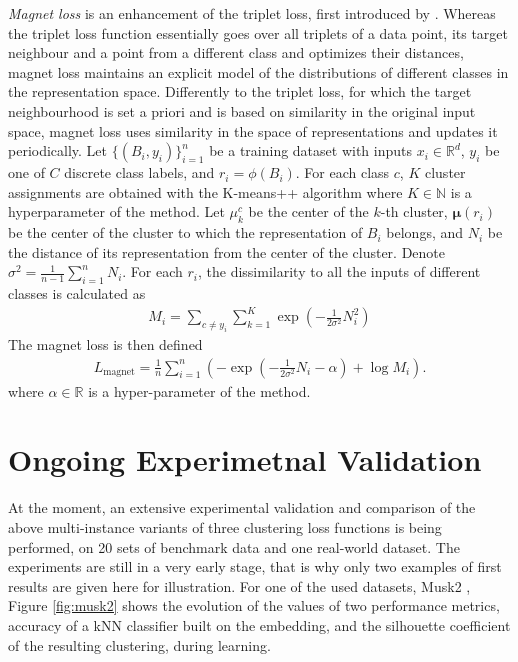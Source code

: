 \documentclass[a4paper]{llncs}
\begin{document}
\emph{Magnet loss} is an enhancement of the triplet loss, first introduced by \cite{rippel_metric_2016}. Whereas the triplet loss function essentially goes over all triplets of a data point, its target neighbour and a point from a different class and optimizes their distances, magnet loss maintains an explicit model of the distributions of different classes in the representation space. Differently to the triplet loss, for which the target neighbourhood is set a priori and is based on similarity in the original input space, magnet loss uses similarity in the space of representations and updates it periodically. Let $\{( B_i, y_i) \}_{i = 1}^n$ be a training dataset with inputs $x_i\in \mathbb{R}^d$, $y_i$ be one of $C$ discrete class labels, and $r_i=\phi (B_i)$. For each class $c$, $K$ cluster assignments are obtained with the K-means++ algorithm \cite{macqueen_methods_1967,arthur_k-means++:_2006} where $K\in \mathbb{N} $ is a hyperparameter of the method. Let $\mu^c_k$ be the center of the $k$-th cluster, $\mathbf{\mu} (r_i)$ be the center of the cluster to which the representation of $B_i$ belongs, and $N_i$ be the distance of its representation from the center of the cluster. Denote $\sigma^2 = \frac{1}{n - 1} \sum_{i = 1}^n N_i$. For each $r_i$, the dissimilarity to all the inputs of different classes is calculated as
\begin{gather}
	M_i = \sum_{c \neq y_i} \sum_{k = 1}^K \exp \left( - \frac{1}{2 \sigma^2} N_i^2\right)
\end{gather}
The magnet loss is then defined
\begin{gather}
	L_\text{magnet} = \frac{1}{n} \sum_{i = 1}^n \left( -\exp \left( - \frac{1}{2 \sigma^2} N_i - \alpha \right)+\log M_i \right).
\end{gather}
where  $\alpha \in \mathbb{R} $ is a hyper-parameter of the method.

\section{Ongoing Experimetnal Validation}

At the moment, an extensive experimental validation and comparison of the above multi-instance variants of three clustering loss functions is being performed, on 20 sets of benchmark data and one real-world dataset. The experiments are still in a very early stage, that is why only two examples of first results are given here for illustration. For one of the used datasets, Musk2 \cite{dietterich_solving_1997}, Figure \ref{fig:musk2} shows the evolution of the values of two performance metrics, accuracy of a kNN classifier built on the embedding, and the silhouette coefficient of the resulting clustering, during learning.
\end{document}
